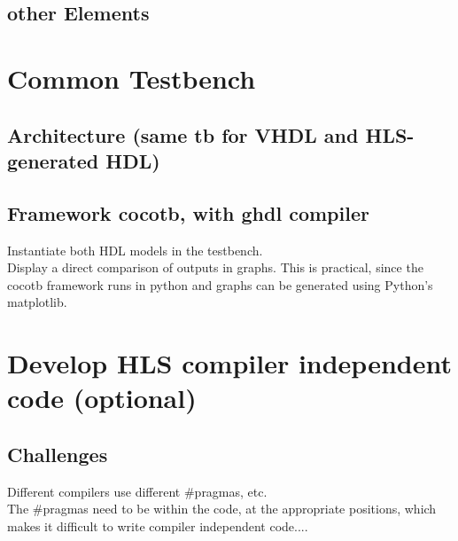   \subsection{other Elements}

\section{Common Testbench}
  \subsection{Architecture (same tb for VHDL and HLS-generated HDL)}
  \subsection{Framework cocotb, with ghdl compiler}
  Instantiate both HDL models in the testbench.\\
  Display a direct comparison of outputs in graphs. This is practical, since the cocotb framework runs in python and graphs can be generated using Python's matplotlib.

\section{Develop HLS compiler independent code (optional)}
  \subsection{Challenges}
  Different compilers use different \#pragmas, etc.\\
  The \#pragmas need to be within the code, at the appropriate positions, which makes it difficult to write compiler independent code....
